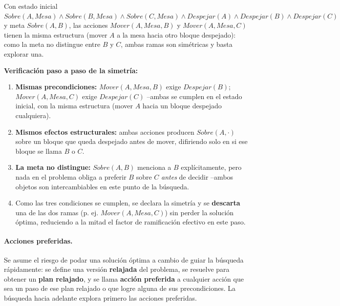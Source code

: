 \begin{example}
Con estado inicial $Sobre(A,Mesa)\land Sobre(B,Mesa)\land Sobre(C,Mesa)\land Despejar(A)\land
Despejar(B)\land Despejar(C)$ y meta $Sobre(A,B)$, las acciones $Mover(A,Mesa,B)$ y $Mover(A,Mesa,C)$
tienen la misma estructura (mover $A$ a la mesa hacia otro bloque despejado): como la meta no
distingue entre $B$ y $C$, ambas ramas son simétricas y basta explorar una.

\textbf{Verificación paso a paso de la simetría:}
\begin{enumerate}
    \item \textbf{Mismas precondiciones:} $Mover(A,Mesa,B)$ exige $Despejar(B)$;
    $Mover(A,Mesa,C)$ exige $Despejar(C)$ --ambas se cumplen en el estado inicial, con la misma
    estructura (mover $A$ hacia un bloque despejado cualquiera).
    \item \textbf{Mismos efectos estructurales:} ambas acciones producen $Sobre(A,\cdot)$ sobre un
    bloque que queda despejado antes de mover, difiriendo solo en si ese bloque se llama $B$ o $C$.
    \item \textbf{La meta no distingue:} $Sobre(A,B)$ menciona a $B$ explícitamente, pero nada en el
    problema obliga a preferir $B$ sobre $C$ \emph{antes} de decidir --ambos objetos son
    intercambiables en este punto de la búsqueda.
    \item Como las tres condiciones se cumplen, se declara la simetría y se \textbf{descarta} una de
    las dos ramas (p. ej. $Mover(A,Mesa,C)$) sin perder la solución óptima, reduciendo a la mitad el
    factor de ramificación efectivo en este paso.
\end{enumerate}
\end{example}

\paragraph{Acciones preferidas.} Se asume el riesgo de podar una solución óptima a cambio de guiar
la búsqueda rápidamente: se define una versión \textbf{relajada} del problema, se resuelve para
obtener un \textbf{plan relajado}, y se llama \textbf{acción preferida} a cualquier acción que sea un
paso de ese plan relajado o que logre alguna de sus precondiciones. La búsqueda hacia adelante
explora primero las acciones preferidas.

